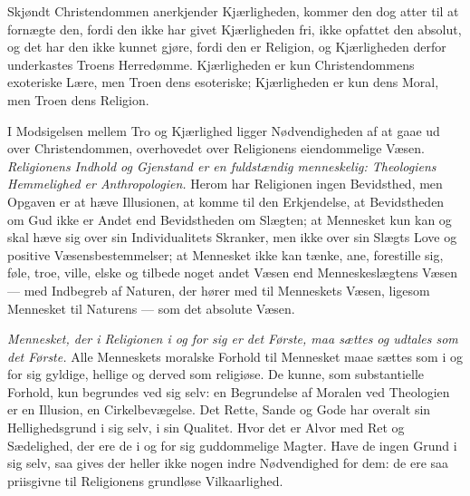 Skjøndt Christendommen anerkjender Kjærligheden, kommer den dog atter til at
fornægte den, fordi den ikke har givet Kjærligheden fri, ikke opfattet den
absolut, og det har den ikke kunnet gjøre, fordi den er Religion, og
Kjærligheden derfor underkastes Troens Herredømme. Kjærligheden er kun
Christendommens exoteriske Lære, men Troen dens esoteriske; Kjærligheden er kun
dens Moral, men Troen dens Religion.

I Modsigelsen mellem Tro og Kjærlighed ligger Nødvendigheden af at gaae ud over
Christendommen, overhovedet over Religionens eiendommelige Væsen.
\emph{Religionens Indhold og Gjenstand er en fuldstændig menneskelig: Theologiens
Hemmelighed er Anthropologien.}
Herom har Religionen ingen Bevidsthed, men Opgaven er at hæve Illusionen, at
komme til den Erkjendelse, at Bevidstheden om Gud ikke er Andet end
Bevidstheden om Slægten; at Mennesket kun kan og skal hæve sig over sin
Individualitets Skranker, men ikke over sin Slægts Love og positive
Væsensbestemmelser; at Mennesket ikke kan tænke, ane, forestille sig, føle,
troe, ville, elske og tilbede
 noget andet Væsen end Menneskeslægtens Væsen --- med Indbegreb af Naturen, der
hører med til Menneskets Væsen, ligesom Mennesket til Naturens --- som det
absolute Væsen.

\emph{Mennesket, der i Religionen i og for sig er det Første, maa sættes og
udtales som det Første.} Alle Menneskets moralske Forhold til Mennesket maae
sættes som i og for sig gyldige, hellige og derved som religiøse. De kunne, som
substantielle Forhold, kun begrundes ved sig selv: en Begrundelse af Moralen
ved Theologien er en Illusion, en Cirkelbevægelse. Det Rette, Sande og Gode har
overalt sin Hellighedsgrund i sig selv, i sin Qualitet. Hvor det er Alvor med
Ret og Sædelighed, der ere de i og for sig guddommelige Magter. Have de ingen
Grund i sig selv, saa gives der heller ikke nogen indre Nødvendighed for dem:
de ere saa priisgivne til Religionens grundløse Vilkaarlighed.

